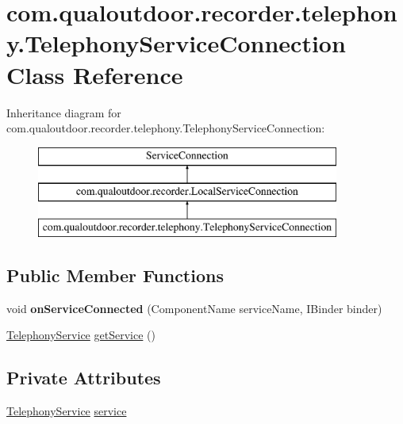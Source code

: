 \hypertarget{classcom_1_1qualoutdoor_1_1recorder_1_1telephony_1_1TelephonyServiceConnection}{\section{com.\-qualoutdoor.\-recorder.\-telephony.\-Telephony\-Service\-Connection Class Reference}
\label{classcom_1_1qualoutdoor_1_1recorder_1_1telephony_1_1TelephonyServiceConnection}
}
Inheritance diagram for com.\-qualoutdoor.\-recorder.\-telephony.\-Telephony\-Service\-Connection\-:\begin{figure}[H]
\begin{center}
\leavevmode
\includegraphics[height=3.000000cm]{classcom_1_1qualoutdoor_1_1recorder_1_1telephony_1_1TelephonyServiceConnection}
\end{center}
\end{figure}
\subsection*{Public Member Functions}
\begin{DoxyCompactItemize}
\item 
\hypertarget{classcom_1_1qualoutdoor_1_1recorder_1_1telephony_1_1TelephonyServiceConnection_acb4ff9183c7f4b7b5f5938a35f97f6c8}{void {\bfseries on\-Service\-Connected} (Component\-Name service\-Name, I\-Binder binder)}\label{classcom_1_1qualoutdoor_1_1recorder_1_1telephony_1_1TelephonyServiceConnection_acb4ff9183c7f4b7b5f5938a35f97f6c8}

\item 
\hyperlink{classcom_1_1qualoutdoor_1_1recorder_1_1telephony_1_1TelephonyService}{Telephony\-Service} \hyperlink{classcom_1_1qualoutdoor_1_1recorder_1_1telephony_1_1TelephonyServiceConnection_ab8017196e7585698b32d6d6766c39f9d}{get\-Service} ()
\end{DoxyCompactItemize}
\subsection*{Private Attributes}
\begin{DoxyCompactItemize}
\item 
\hyperlink{classcom_1_1qualoutdoor_1_1recorder_1_1telephony_1_1TelephonyService}{Telephony\-Service} \hyperlink{classcom_1_1qualoutdoor_1_1recorder_1_1telephony_1_1TelephonyServiceConnection_a209be452896315097a33acbe55d27519}{service}
\end{DoxyCompactItemize}
